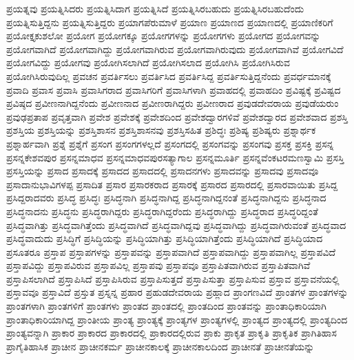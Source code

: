 {ಪ್ರಯತ್ನವು
ಪ್ರಯತ್ನಿಸಿದರು
ಪ್ರಯತ್ನಿಸಿದಾಗ
ಪ್ರಯತ್ನಿಸಿದೆ
ಪ್ರಯತ್ನಿಸಿರಬಹುದು
ಪ್ರಯತ್ನಿಸಿರಬಹುದೆಂದು
ಪ್ರಯತ್ನಿಸುತ್ತಿದ್ದನು
ಪ್ರಯತ್ನಿಸುತ್ತಿದ್ದರು
ಪ್ರಯಾಗಪೆರುಮಾಳೆ
ಪ್ರಯಾಣ
ಪ್ರಯಾಣದ
ಪ್ರಯಾಣದಲ್ಲಿ
ಪ್ರಯಾಣಿಕರಿಗೆ
ಪ್ರಯೋಕ್ತೃಕುಶಲೋ
ಪ್ರಯೋಗ
ಪ್ರಯೋಗಕ್ಕೂ
ಪ್ರಯೋಗಗಳನ್ನು
ಪ್ರಯೋಗಗಳು
ಪ್ರಯೋಗದ
ಪ್ರಯೋಗವನ್ನು
ಪ್ರಯೋಗವಾಗಿದೆ
ಪ್ರಯೋಗವಾಗಿದ್ದು
ಪ್ರಯೋಗವಾಗಿರುವ
ಪ್ರಯೋಗವಾಗಿರುವುದು
ಪ್ರಯೋಗವಾಗಿವೆ
ಪ್ರಯೋಗವಿದೆ
ಪ್ರಯೋಗವಿದ್ದು
ಪ್ರಯೋಗವು
ಪ್ರಯೋಗಿಸಲಾಗಿದೆ
ಪ್ರಯೋಗಿಸಲಾದ
ಪ್ರಯೋಗಿಸಿ
ಪ್ರಯೋಗಿಸಿರುವ
ಪ್ರಯೋಗಿಸಿರುವುದಿಲ್ಲ
ಪ್ರವಚನ
ಪ್ರವರ್ತಿಸಲು
ಪ್ರವರ್ತಿಸಿದ
ಪ್ರವರ್ತಿಸಿದ್ದ
ಪ್ರವರ್ತಿಸುತ್ತಿದ್ದನೆಂದು
ಪ್ರವರ್ಧಮಾನಕ್ಕೆ
ಪ್ರವಾದಿ
ಪ್ರವಾಸ
ಪ್ರವಾಸಿ
ಪ್ರವಾಸಿಗರಾದ
ಪ್ರವಾಸಿಗರಿಗೆ
ಪ್ರವಾಸಿಗಳಾಗಿ
ಪ್ರವಾಹದಲ್ಲಿ
ಪ್ರವಾಹದಿಂ
ಪ್ರವಿಷ್ಟಕ್ಕೆ
ಪ್ರವಿಷ್ಟದ
ಪ್ರವಿಷ್ಠದ
ಪ್ರವೀಣನಾಗಿದ್ದನೆಂದು
ಪ್ರವೀಣನಾದ
ಪ್ರವೀಣರಾಗಿದ್ದರು
ಪ್ರವೀಣರಾದ
ಪ್ರವುಡದೇವರಾಯ
ಪ್ರವುಡೆಯರುಂ
ಪ್ರವುಢಪ್ರತಾಪ
ಪ್ರವೃತ್ತವಾಗಿ
ಪ್ರವೇಶ
ಪ್ರವೇಶಕ್ಕೆ
ಪ್ರವೇಶದಿಂದ
ಪ್ರವೇಶದ್ವಾರಗಳಿವೆ
ಪ್ರವೇಶದ್ವಾರದ
ಪ್ರವೇಶವಾದ
ಪ್ರಶಸ್ತಿ
ಪ್ರಶಸ್ತಿಯ
ಪ್ರಶಸ್ತಿಯನ್ನು
ಪ್ರಶಸ್ತಿಶಾಸನ
ಪ್ರಶಸ್ತಿಶಾಸನವು
ಪ್ರಶಸ್ತಿಸಹಿತ
ಪ್ರಶಿದ್ಧಃ
ಪ್ರಶಿಷ್ಯ
ಪ್ರಶಿಷ್ಯರು
ಪ್ರಶ್ನಾರ್ಥಕ
ಪ್ರಶ್ನಾರ್ಹವಾಗಿ
ಪ್ರಶ್ನೆ
ಪ್ರಶ್ನೆಗೆ
ಪ್ರಸಂಗ
ಪ್ರಸಂಗಗಳಲ್ಲದೆ
ಪ್ರಸಂಗದಲ್ಲಿ
ಪ್ರಸಂಗವನ್ನು
ಪ್ರಸಂಗವು
ಪ್ರಸಕ್ತ
ಪ್ರಸಕ್ತಿ
ಪ್ರಸನ್ನ
ಪ್ರಸನ್ನಕೇಶವಪುರ
ಪ್ರಸನ್ನಮಾಧವ
ಪ್ರಸನ್ನಮಾಧವಪುರಸತ್ಯಾಗಾಲ
ಪ್ರಸನ್ನಮೂರ್ತಿ
ಪ್ರಸನ್ನವೆಂಕಟರಮಣಸ್ವಾಮಿ
ಪ್ರಸಸ್ತಿ
ಪ್ರಸಸ್ತಿಯನ್ನು
ಪ್ರಸಾದ
ಪ್ರಸಾದಕ್ಕೆ
ಪ್ರಸಾದದ
ಪ್ರಸಾದದಲ್ಲಿ
ಪ್ರಸಾದನಗಳು
ಪ್ರಸಾದವನ್ನು
ಪ್ರಸಾದವು
ಪ್ರಸಾದವೂ
ಪ್ರಸಾದಾನುಭಾವಿಗಳಪ್ಪ
ಪ್ರಸಾದಿತ
ಪ್ರಸಾರ
ಪ್ರಸಾರಕರಾದ
ಪ್ರಸಾರಕ್ಕೆ
ಪ್ರಸಾರದ
ಪ್ರಸಾರದಲ್ಲಿ
ಪ್ರಸಾರವಾಯಿತು
ಪ್ರಸಿದ್ದ
ಪ್ರಸಿದ್ದರಾದವರು
ಪ್ರಸಿದ್ಧ
ಪ್ರಸಿದ್ಧಃ
ಪ್ರಸಿದ್ಧನಾಗಿ
ಪ್ರಸಿದ್ಧನಾಗಿದ್ದ
ಪ್ರಸಿದ್ಧನಾಗಿದ್ದನಂತೆ
ಪ್ರಸಿದ್ಧನಾಗಿದ್ದನು
ಪ್ರಸಿದ್ಧನಾದ
ಪ್ರಸಿದ್ಧನಾದನು
ಪ್ರಸಿದ್ಧನು
ಪ್ರಸಿದ್ಧರಾಗಿದ್ದರು
ಪ್ರಸಿದ್ಧರಾಗಿದ್ದರೆಂದು
ಪ್ರಸಿದ್ಧರಾಗಿದ್ದು
ಪ್ರಸಿದ್ಧರಾದ
ಪ್ರಸಿದ್ಧರಿದ್ದಂತೆ
ಪ್ರಸಿದ್ಧವಾಗಿತ್ತು
ಪ್ರಸಿದ್ಧವಾಗಿತ್ತೆಂದು
ಪ್ರಸಿದ್ಧವಾಗಿದೆ
ಪ್ರಸಿದ್ಧವಾಗಿದ್ದವು
ಪ್ರಸಿದ್ಧವಾಗಿದ್ದು
ಪ್ರಸಿದ್ಧವಾಗಿರುವಂತೆ
ಪ್ರಸಿದ್ಧವಾದ
ಪ್ರಸಿದ್ಧವಾದುದು
ಪ್ರಸಿದ್ಧಿಗೆ
ಪ್ರಸಿದ್ಧಿಯನ್ನು
ಪ್ರಸಿದ್ಧಿಯಾಗಿತ್ತು
ಪ್ರಸಿದ್ಧಿಯಾಗಿತ್ತೆಂದು
ಪ್ರಸಿದ್ಧಿಯಾಗಿದೆ
ಪ್ರಸಿದ್ಧಿಯಾದ
ಪ್ರಸೂತರೂ
ಪ್ರಸ್ತಾಪ
ಪ್ರಸ್ತಾಪಗಳನ್ನು
ಪ್ರಸ್ತಾಪವನ್ನು
ಪ್ರಸ್ತಾಪವಾಗಿದೆ
ಪ್ರಸ್ತಾಪವಾಗಿದ್ದು
ಪ್ರಸ್ತಾಪವಾಗಿಲ್ಲ
ಪ್ರಸ್ತಾಪವಿದೆ
ಪ್ರಸ್ತಾಪವಿದ್ದು
ಪ್ರಸ್ತಾಪವಿರುವ
ಪ್ರಸ್ತಾಪವಿಲ್ಲ
ಪ್ರಸ್ತಾಪವು
ಪ್ರಸ್ತಾಪವೂ
ಪ್ರಸ್ತಾಪಿತವಾಗಿರುವ
ಪ್ರಸ್ತಾಪಿತವಾಗಿವೆ
ಪ್ರಸ್ತಾಪಿಸಲಾಗಿದೆ
ಪ್ರಸ್ತಾಪಿಸಿದೆ
ಪ್ರಸ್ತಾಪಿಸಿರುವ
ಪ್ರಸ್ತಾಪಿಸುತ್ತದೆ
ಪ್ರಸ್ತಾಪಿಸುತ್ತಾ
ಪ್ರಸ್ತಾಪಿಸುವ
ಪ್ರಸ್ತಾವ
ಪ್ರಸ್ತಾವನೆಯಲ್ಲಿ
ಪ್ರಸ್ತಾವವೂ
ಪ್ರಸ್ತಾವಿದೆ
ಪ್ರಸ್ತುತ
ಪ್ರಸ್ನನ್ನ
ಪ್ರಹಾರ
ಪ್ರಹುಡದೇವರಾಯ
ಪ್ರಹ್ಲಾದ
ಪ್ರಾಂಗಣವಿದೆ
ಪ್ರಾಂತಗಳ
ಪ್ರಾಂತಗಳನ್ನು
ಪ್ರಾಂತಗಳಾಗಿ
ಪ್ರಾಂತಗಳಿಗೆ
ಪ್ರಾಂತಗಳು
ಪ್ರಾಂತದ
ಪ್ರಾಂತದಲ್ಲಿ
ಪ್ರಾಂತದಿಂದ
ಪ್ರಾಂತವನ್ನು
ಪ್ರಾಂತಾಧಿಕಾರಿಯಾಗಿ
ಪ್ರಾಂತಾಧಿಕಾರಿಯಾಗಿದ್ದ
ಪ್ರಾಂತೀಯ
ಪ್ರಾಂತ್ಯ
ಪ್ರಾಂತ್ಯಕ್ಕೆ
ಪ್ರಾಂತ್ಯಗಳ
ಪ್ರಾಂತ್ಯಗಳಲ್ಲಿ
ಪ್ರಾಂತ್ಯದ
ಪ್ರಾಂತ್ಯದಲ್ಲಿ
ಪ್ರಾಂತ್ಯದಿಂದ
ಪ್ರಾಂತ್ಯವನ್ನಾಗಿ
ಪ್ರಾಕಾರ
ಪ್ರಾಕಾರದ
ಪ್ರಾಕಾರದಲ್ಲಿ
ಪ್ರಾಕಾರದಲ್ಲಿರುವ
ಪ್ರಾಕು
ಪ್ರಾಕೃತ
ಪ್ರಾಕೃತಿ
ಪ್ರಾಕೃತಿಕ
ಪ್ರಾಗಿತಿಹಾಸ
ಪ್ರಾಗೈತಿಹಾಸಿಕ
ಪ್ರಾಚೀನ
ಪ್ರಾಚೀನಕರ್ಮ
ಪ್ರಾಚೀನಕಾಲಕ್ಕೆ
ಪ್ರಾಚೀನಕಾಲದಿಂದ
ಪ್ರಾಚೀನತೆ
ಪ್ರಾಚೀನತೆಯನ್ನು
}
